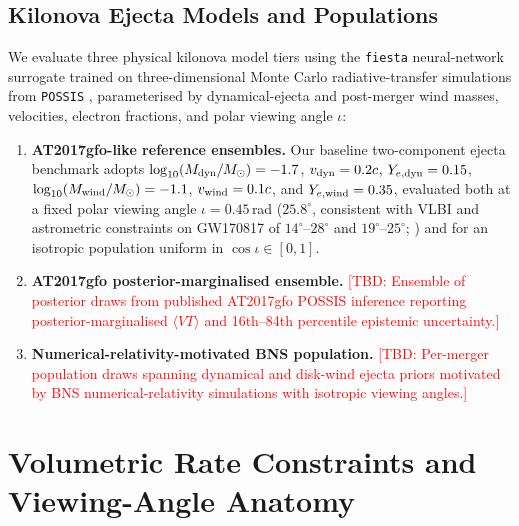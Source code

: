 \documentclass[twocolumn]{aastex631}
\newcommand{\tbd}[1]{\textcolor{red}{[TBD: #1]}}
\newcommand{\msun}{M_\odot}
\newcommand{\vteff}{\langle VT\rangle}
\begin{document}
\subsection{Kilonova Ejecta Models and Populations}
We evaluate three physical kilonova model tiers using the \texttt{fiesta} neural-network surrogate \citep{Koehn2025} trained on three-dimensional Monte Carlo radiative-transfer simulations from \texttt{POSSIS} \citep{Bulla2019, Bulla2023}, parameterised by dynamical-ejecta and post-merger wind masses, velocities, electron fractions, and polar viewing angle $\iota$:
\begin{enumerate}
\item \textbf{AT2017gfo-like reference ensembles.} Our baseline two-component ejecta benchmark adopts $\log_{10}(M_{\rm dyn}/\msun) = -1.7$, $v_{\rm dyn} = 0.2c$, $Y_{e,\rm dyn} = 0.15$, $\log_{10}(M_{\rm wind}/\msun) = -1.1$, $v_{\rm wind} = 0.1c$, and $Y_{e,\rm wind} = 0.35$, evaluated both at a fixed polar viewing angle $\iota = 0.45$\,rad ($25.8^\circ$, consistent with VLBI and astrometric constraints on GW170817 of $14^\circ$--$28^\circ$ and $19^\circ$--$25^\circ$; \citealt{Mooley2018, Mooley2022}) and for an isotropic population uniform in $\cos\iota \in [0, 1]$.
\item \textbf{AT2017gfo posterior-marginalised ensemble.} \tbd{Ensemble of posterior draws from published AT2017gfo POSSIS inference \citep{Anand2023} reporting posterior-marginalised $\vteff$ and 16th--84th percentile epistemic uncertainty.}
\item \textbf{Numerical-relativity-motivated BNS population.} \tbd{Per-merger population draws spanning dynamical and disk-wind ejecta priors motivated by BNS numerical-relativity simulations \citep{Radice2018} with isotropic viewing angles.}
\end{enumerate}

\section{Volumetric Rate Constraints and Viewing-Angle Anatomy}
\label{sec:results}
\end{document}
